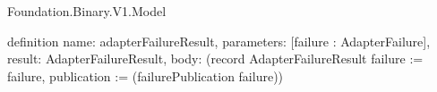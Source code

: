 \begin{lexlean}{Foundation.Binary.V1.Model}
\begin{semanticmodule}
definition{
  name: adapterFailureResult,
  parameters: [failure : AdapterFailure],
  result: AdapterFailureResult,
  body: (record AdapterFailureResult {failure := failure, publication := (failurePublication failure)})
}
\end{semanticmodule}
\end{lexlean}
